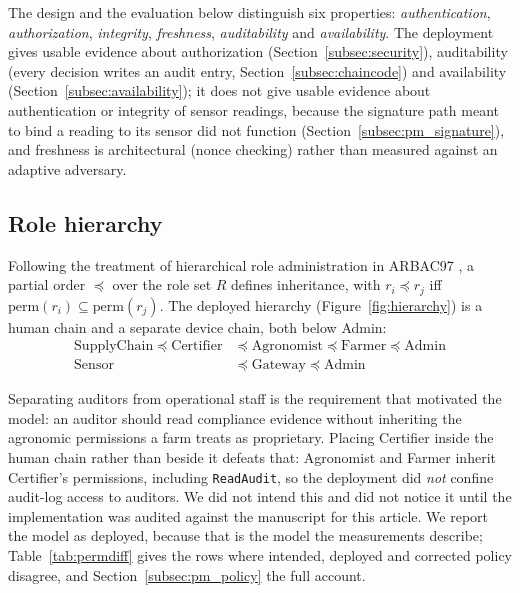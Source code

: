 \documentclass[a4paper,fleqn]{cas-dc}
\begin{document}
The design and the evaluation below distinguish six properties:
\emph{authentication}, \emph{authorization}, \emph{integrity},
\emph{freshness}, \emph{auditability} and \emph{availability}. The
deployment gives usable evidence about authorization
(Section~\ref{subsec:security}), auditability (every decision writes an
audit entry, Section~\ref{subsec:chaincode}) and availability
(Section~\ref{subsec:availability}); it does not give usable evidence about
authentication or integrity of sensor readings, because the signature path
meant to bind a reading to its sensor did not function
(Section~\ref{subsec:pm_signature}), and freshness is architectural (nonce
checking) rather than measured against an adaptive adversary.

\subsection{Role hierarchy}
\label{subsec:roles}

Following the treatment of hierarchical role administration in ARBAC97
\cite{sandhu1999arbac97}, a partial order $\preceq$ over the role set $R$
defines inheritance, with $r_i \preceq r_j$ iff
$\mathrm{perm}(r_i) \subseteq \mathrm{perm}(r_j)$. The deployed hierarchy
(Figure~\ref{fig:hierarchy}) is a human chain and a separate device chain,
both below Admin:
\begin{align}
\mathrm{SupplyChain} \preceq \mathrm{Certifier} &\preceq
  \mathrm{Agronomist} \preceq \mathrm{Farmer} \preceq \mathrm{Admin}
  \label{eq:human}\\
\mathrm{Sensor} &\preceq \mathrm{Gateway} \preceq \mathrm{Admin}
  \label{eq:device}
\end{align}

Separating auditors from operational staff is the requirement that motivated
the model: an auditor should read compliance evidence without inheriting the
agronomic permissions a farm treats as proprietary. Placing Certifier inside
the human chain rather than beside it defeats that: Agronomist and Farmer
inherit Certifier's permissions, including \texttt{ReadAudit}, so the
deployment did \emph{not} confine audit-log access to auditors. We did not
intend this and did not notice it until the implementation was audited
against the manuscript for this article. We report the model as deployed,
because that is the model the measurements describe; Table~\ref{tab:permdiff}
gives the rows where intended, deployed and corrected policy disagree, and
Section~\ref{subsec:pm_policy} the full account.
\end{document}
